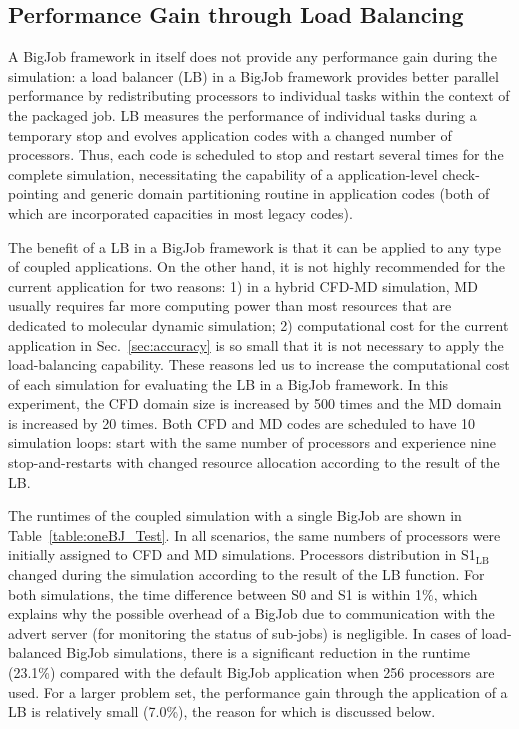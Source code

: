 \documentclass[preprint,12pt]{elsarticle}
\newcommand{\subscript}[1]{\ensuremath{_{\textrm{#1}}}}
\newcommand{\lb}[0]{\subscript{LB} }
\begin{document}
\subsection{Performance Gain through Load Balancing}
\label{sec:performance_LoadBalancing}

A BigJob framework in itself does not provide any performance gain during the simulation: a load balancer (LB) in a BigJob framework provides better parallel performance by redistributing processors to individual tasks within the context of the packaged job. LB measures the performance of individual tasks during a temporary stop and evolves application codes with a changed number of processors. Thus, each code is scheduled to stop and restart several times for the complete simulation, necessitating the capability of a application-level check-pointing and generic domain partitioning routine in application codes (both of which are incorporated capacities in most legacy codes).

The benefit of a LB in a BigJob framework is that it can be applied to any type of coupled applications. On the other hand, it is not highly recommended for the current application for two reasons: 1) in a hybrid CFD-MD simulation, MD usually requires far more computing power than most resources that are dedicated to molecular dynamic simulation; 2) computational cost for the current application in Sec.~\ref{sec:accuracy} is so small that it is not necessary to apply the load-balancing capability. These reasons led us to increase the computational cost of each simulation for evaluating the LB in a BigJob framework. In this experiment, the CFD domain size is increased by 500 times and the MD domain is increased by 20 times. Both CFD and MD codes are scheduled to have 10 simulation loops: start with the same number of processors and experience nine stop-and-restarts with changed resource allocation according to the result of the LB.

The runtimes of the coupled simulation with a single BigJob are shown in Table~\ref{table:oneBJ_Test}. In all scenarios, the same numbers of processors were initially assigned to CFD and MD simulations. Processors distribution in S1\lb changed during the simulation according to the result of the LB function. For both simulations, the time difference between S0 and S1 is within 1\%, which explains why the possible overhead of a BigJob due to communication with the advert server (for monitoring the status of sub-jobs) is negligible. In cases of load-balanced BigJob simulations, there is a significant reduction in the runtime (23.1\%) compared with the default BigJob application when 256 processors are used. For a larger problem set, the performance gain through the application of a LB is relatively small (7.0\%), the reason for which is discussed below.
\end{document}
